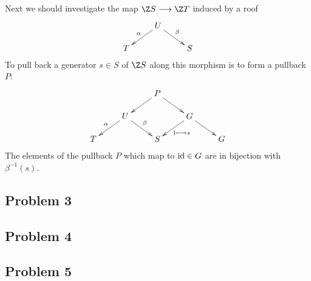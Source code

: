 \documentclass[11pt]{article}
\begin{document}
Next we should investigate the map $\Z S\to\Z T$ induced by a roof
\[\xymatrix@R=5mm{&U\ar[dl]_\alpha\ar[dr]^\beta\\T&&S}\]
To pull back a generator $s\in S$ of $\Z S$ along this morphism is to form a pullback $P$:
\[\xymatrix@R=5mm{
&&P\ar[dl]\ar[dr]\\
&U\ar[dl]_\alpha\ar[dr]^\beta&&G\ar[dl]^{1\shortmapsto s}\ar[dr]\\
T&&S&&G
}\]
The elements of the pullback $P$ which map to $\textup{id}\in G$ are in bijection with $\beta^{-1}(s)$.
\subsection*{Problem 3}
\subsection*{Problem 4}
\subsection*{Problem 5}
\end{document}
